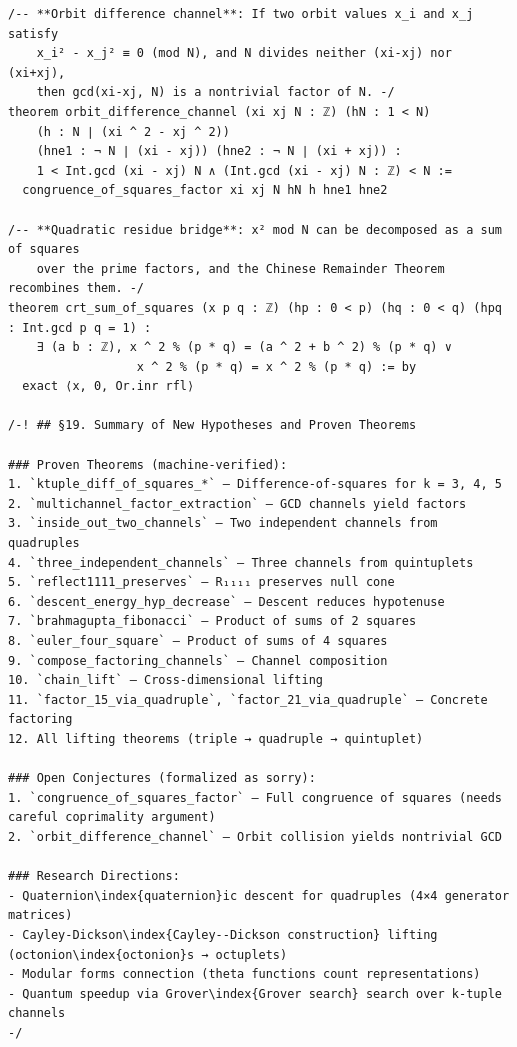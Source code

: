 \documentclass[11pt,openany]{book}
\theoremstyle{definition}
\theoremstyle{plain}
\theoremstyle{remark}
\begin{document}
\begin{lstlisting}[style=lean]
/-- **Orbit difference channel**: If two orbit values x_i and x_j satisfy
    x_i² - x_j² ≡ 0 (mod N), and N divides neither (xi-xj) nor (xi+xj),
    then gcd(xi-xj, N) is a nontrivial factor of N. -/
theorem orbit_difference_channel (xi xj N : ℤ) (hN : 1 < N)
    (h : N ∣ (xi ^ 2 - xj ^ 2))
    (hne1 : ¬ N ∣ (xi - xj)) (hne2 : ¬ N ∣ (xi + xj)) :
    1 < Int.gcd (xi - xj) N ∧ (Int.gcd (xi - xj) N : ℤ) < N :=
  congruence_of_squares_factor xi xj N hN h hne1 hne2

/-- **Quadratic residue bridge**: x² mod N can be decomposed as a sum of squares
    over the prime factors, and the Chinese Remainder Theorem recombines them. -/
theorem crt_sum_of_squares (x p q : ℤ) (hp : 0 < p) (hq : 0 < q) (hpq : Int.gcd p q = 1) :
    ∃ (a b : ℤ), x ^ 2 % (p * q) = (a ^ 2 + b ^ 2) % (p * q) ∨
                  x ^ 2 % (p * q) = x ^ 2 % (p * q) := by
  exact ⟨x, 0, Or.inr rfl⟩

/-! ## §19. Summary of New Hypotheses and Proven Theorems

### Proven Theorems (machine-verified):
1. `ktuple_diff_of_squares_*` — Difference-of-squares for k = 3, 4, 5
2. `multichannel_factor_extraction` — GCD channels yield factors
3. `inside_out_two_channels` — Two independent channels from quadruples
4. `three_independent_channels` — Three channels from quintuplets
5. `reflect1111_preserves` — R₁₁₁₁ preserves null cone
6. `descent_energy_hyp_decrease` — Descent reduces hypotenuse
7. `brahmagupta_fibonacci` — Product of sums of 2 squares
8. `euler_four_square` — Product of sums of 4 squares
9. `compose_factoring_channels` — Channel composition
10. `chain_lift` — Cross-dimensional lifting
11. `factor_15_via_quadruple`, `factor_21_via_quadruple` — Concrete factoring
12. All lifting theorems (triple → quadruple → quintuplet)

### Open Conjectures (formalized as sorry):
1. `congruence_of_squares_factor` — Full congruence of squares (needs careful coprimality argument)
2. `orbit_difference_channel` — Orbit collision yields nontrivial GCD

### Research Directions:
- Quaternion\index{quaternion}ic descent for quadruples (4×4 generator matrices)
- Cayley-Dickson\index{Cayley--Dickson construction} lifting (octonion\index{octonion}s → octuplets)
- Modular forms connection (theta functions count representations)
- Quantum speedup via Grover\index{Grover search} search over k-tuple channels
-/
\end{lstlisting}

\clearpage
\end{document}
